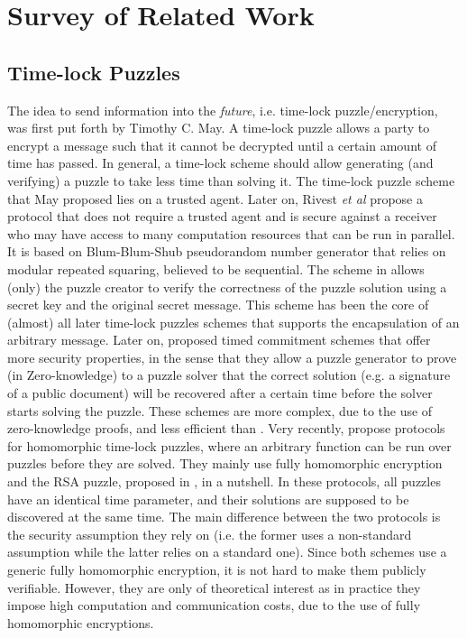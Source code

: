 \section{Survey of Related Work}\label{Survey-of-Related-Work}
\subsection{Time-lock Puzzles}

The idea to send information into the \emph{future}, i.e.
time-lock puzzle/encryption, was first put forth by Timothy C. May. A time-lock puzzle allows a party to encrypt a message such that it cannot be decrypted  until a certain amount of time has passed. In general,  a  time-lock scheme should allow    generating (and verifying) a puzzle to take less time than solving it. The time-lock puzzle scheme that May proposed lies on a trusted agent. Later on, Rivest \textit{et al} \cite{Rivest:1996:TPT:888615} propose a protocol that does not require a trusted agent and is secure against a receiver
who may have access to many  computation resources that can be run in parallel. It is based on Blum-Blum-Shub pseudorandom number generator that relies on modular repeated squaring, believed to be sequential. The scheme in \cite{Rivest:1996:TPT:888615} allows (only) the puzzle creator to  verify the correctness of the puzzle solution using a secret key and the original secret message.  This scheme has been the core of (almost) all later time-lock puzzles schemes that supports the encapsulation of an arbitrary message. Later on, \cite{BonehN00,DBLP:conf/fc/GarayJ02} proposed timed commitment schemes that offer more security properties, in the sense that they   allow a puzzle generator to prove (in Zero-knowledge) to a puzzle solver that the correct solution (e.g. a signature of a public document) will be recovered after a certain time before the solver starts solving the puzzle. These schemes are more complex, due to the use of zero-knowledge proofs, and less efficient than \cite{Rivest:1996:TPT:888615}.    Very recently, \cite{MalavoltaT19,BrakerskiDGM19}  propose protocols for homomorphic time-lock puzzles, where an arbitrary function can be run over puzzles before they are solved. They mainly use  fully homomorphic encryption and   the RSA puzzle, proposed in \cite{BrakerskiDGM19}, in a nutshell. In these protocols, all puzzles have an identical time parameter, and their solutions are supposed to be discovered at the same time. The main difference between the two protocols is the security assumption they rely on (i.e. the former uses a non-standard assumption while the latter relies on a standard one). Since both schemes use a generic fully homomorphic encryption, it is not hard to make them publicly verifiable. However, they  are only of theoretical interest as in practice they impose  high computation and communication costs, due to the use of fully homomorphic encryptions.


